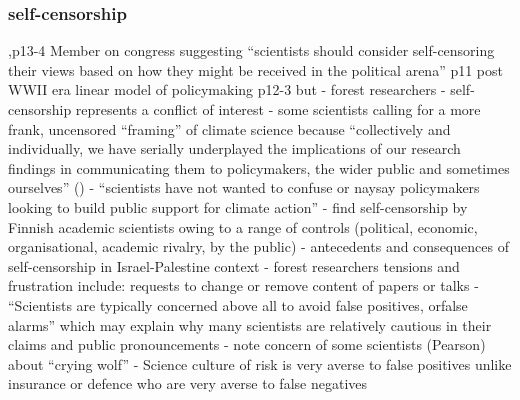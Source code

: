 \subsubsection{self-censorship}
\cite{Pielke2007},p13-4 Member on congress suggesting ``scientists should consider self-censoring their views based on how they might be received in the political arena'' p11 post WWII era linear model of policymaking p12-3 but \cite{OjanenBKP2021} - forest researchers - self-censorship represents a conflict of interest
\cite{SimmsA2020,Carton2021,Bendell2024} - some scientists calling for a more frank, uncensored ``framing'' of climate science because ``collectively and individually, we have serially underplayed the implications of our research findings in communicating them to policymakers, the wider public and sometimes ourselves'' (\cite{CalverleyA2022})
\cite{Pearce2024} - ``scientists have not wanted to confuse or naysay policymakers looking to build public support for climate action''
\cite{ValiverronenS2021} - find self-censorship by Finnish academic scientists owing to a range of controls (political, economic, organisational, academic rivalry, by the public) 
\cite{BarTal2017} - antecedents and consequences of self-censorship in Israel-Palestine context
\cite{OjanenBKP2021} - forest researchers tensions and frustration include: requests to change or remove content of papers or talks
\cite{ReadO2017} - ``Scientists are typically concerned above all to avoid false positives, orfalse alarms'' which may explain why many scientists are relatively cautious in their claims and public pronouncements
\cite{GregoryBW2024} - note concern of some scientists (Pearson) about ``crying wolf''
\cite{PoeS2023} - Science culture of risk is very averse to false positives unlike insurance or defence who are very averse to false negatives



